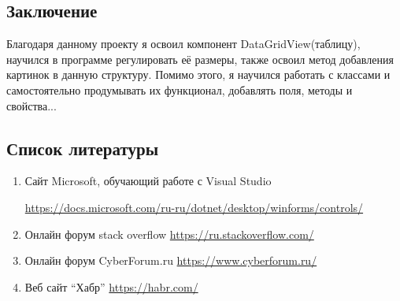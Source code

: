 \documentclass[14pt, a4paper]{extarticle}
\begin{document}
\begin{center}
\section*{Заключение}
\end{center}
\par Благодаря данному проекту я освоил компонент DataGridView(таблицу), научился в программе регулировать её размеры, также освоил метод добавления картинок в данную структуру. Помимо этого, я научился работать с классами и самостоятельно продумывать их функционал, добавлять поля, методы и свойства...
\newpage
\setcounter{subsection}{0}
\setcounter{equation}{0}
\setcounter{section}{0}

\begin{center}
\section*{Список литературы}
\end{center}
\begin{enumerate}
    \item Сайт Microsoft, обучающий работе с Visual Studio \par \url{https://docs.microsoft.com/ru-ru/dotnet/desktop/winforms/controls/}
    \item Онлайн форум stack overflow \url{https://ru.stackoverflow.com/}
    \item Онлайн форум CyberForum.ru \url{https://www.cyberforum.ru/}
    \item Веб сайт “Хабр” \url{https://habr.com/}
\end{enumerate}
\end{document}
